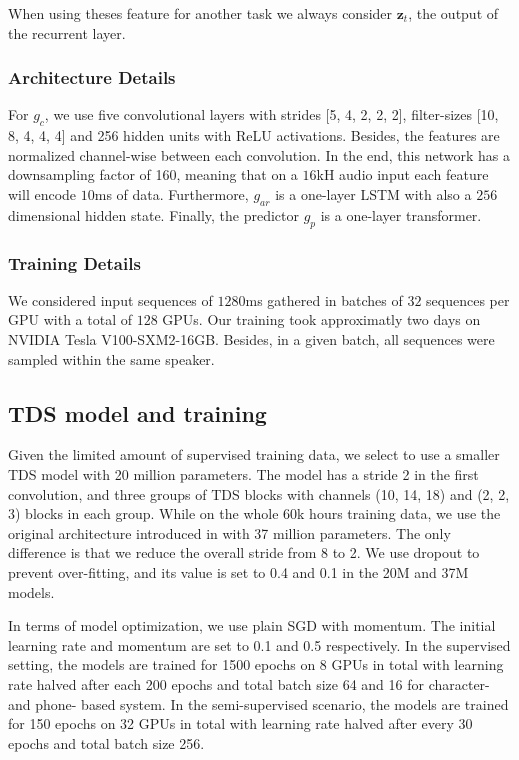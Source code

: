 \documentclass{article}
\begin{document}
When using theses feature for another task we always consider $\mathbf{z}_t$, the output of the recurrent layer.

\subsubsection{Architecture Details}

For $g_c$, we use five convolutional layers with strides [5, 4, 2, 2, 2], filter-sizes [10, 8, 4, 4, 4] and 256 hidden units with ReLU activations. 
Besides, the features are normalized channel-wise between each convolution.
In the end, this network has a downsampling factor of 160, meaning that on a $16$kH audio input each feature will encode $10$ms of data.
Furthermore, $g_{ar}$ is a one-layer LSTM with also a $256$ dimensional hidden state.
Finally, the predictor $g_p$ is a one-layer transformer.

\subsubsection{Training Details}

We considered input sequences of $1280$ms gathered in batches of $32$ sequences per GPU with a total of $128$ GPUs.
Our training took approximatly two days on NVIDIA Tesla V100-SXM2-16GB.
Besides, in a given batch, all sequences were sampled within the same speaker.


\subsection{TDS model and training}
Given the limited amount of supervised training data, we select to use a smaller TDS model \cite{hannun2019tds} with 20 million parameters. The model has a stride 2 in the first convolution, and three groups of TDS blocks with channels (10, 14, 18) and (2, 2, 3) blocks in each group. While on the whole 60k hours training data, we use the original architecture introduced in \cite{hannun2019tds} with 37 million parameters. The only difference is that we reduce the overall stride from 8 to 2. We use dropout to prevent over-fitting, and its value is set to 0.4 and 0.1 in the 20M and 37M models.

In terms of model optimization, we use plain SGD with momentum. The initial learning rate and momentum are set to 0.1 and 0.5 respectively. In the supervised setting, the models are trained for 1500 epochs on 8 GPUs in total with learning rate halved after each 200 epochs and total batch size 64 and 16 for character- and phone- based system. In the semi-supervised scenario, the models are trained for 150 epochs on 32 GPUs in total with learning rate halved after every 30 epochs and total batch size 256.
\end{document}
